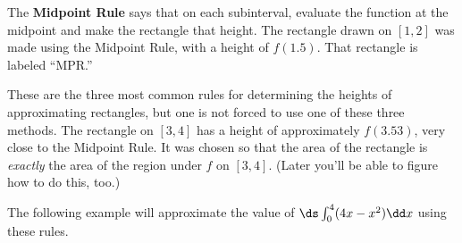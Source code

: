 The \textbf{Midpoint Rule} says that on each subinterval, evaluate the function at the midpoint and make the rectangle that height. The rectangle drawn on $[1,2]$ was made using the Midpoint Rule, with a height of $f(1.5)$. That rectangle is labeled ``MPR.''

These are the three most common rules for determining the heights of approximating rectangles, but one is not forced to use one of these three methods. The rectangle on $[3,4]$ has a height of approximately $f(3.53)$, very close to the Midpoint Rule. It was chosen so that the area of the rectangle is \emph{exactly} the area of the region under $f$ on $[3,4]$. (Later you'll be able to figure how to do this, too.)

The following example will approximate the value of $\ds\int_0^4 (4x-x^2)\dd x$ using these rules.

